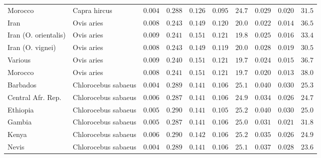 \documentclass{article}
\begin{document}
\begin{center}
\begin{longtable*}{|l|l|r|r|r|r|r|r|r|r|}
            Morocco              & Capra hircus        & $ 0.004$              & $ 0.288$                      & $ 0.126$ & $ 0.095$     & $  24.7$      & $ 0.029$ & $ 0.020$ & $  31.5$ \\
            Iran                 & Ovis aries          & $ 0.008$              & $ 0.243$                      & $ 0.149$ & $ 0.120$     & $  20.0$      & $ 0.022$ & $ 0.014$   & $  36.5$    \\
            Iran (O. orientalis) & Ovis aries          & $ 0.009$              & $ 0.241$                      & $ 0.151$ & $ 0.121$     & $  19.8$      & $ 0.025$ & $ 0.016$ & $  33.4$ \\
            Iran (O. vignei)     & Ovis aries          & $ 0.008$              & $ 0.243$                      & $ 0.149$ & $ 0.119$     & $  20.0$      & $ 0.028$ & $ 0.019$ & $  30.5$ \\
            Various              & Ovis aries          & $ 0.009$              & $ 0.240$                      & $ 0.151$ & $ 0.121$     & $  19.7$      & $ 0.024$ & $ 0.015$   & $  36.7$    \\
            Morocco              & Ovis aries          & $ 0.008$              & $ 0.241$                      & $ 0.151$ & $ 0.121$     & $  19.7$      & $ 0.020$ & $ 0.013$   & $  38.0$    \\
            Barbados             & Chlorocebus sabaeus & $ 0.004$              & $ 0.289$                      & $ 0.141$ & $ 0.106$     & $  25.1$      & $ 0.040$ & $ 0.030$ & $  25.3$ \\
            Central Afr. Rep.    & Chlorocebus sabaeus & $ 0.006$              & $ 0.287$                      & $ 0.141$ & $ 0.106$     & $  24.9$ & $ 0.034$ & $ 0.026$ & $  24.7$ \\
            Ethiopia             & Chlorocebus sabaeus & $ 0.005$              & $ 0.290$                      & $ 0.141$ & $ 0.105$     & $  25.2$      & $ 0.040$ & $ 0.030$ & $  25.0$ \\
            Gambia               & Chlorocebus sabaeus & $ 0.005$              & $ 0.287$                      & $ 0.141$ & $ 0.106$     & $  25.0$      & $ 0.031$ & $ 0.021$ & $  31.8$ \\
            Kenya                & Chlorocebus sabaeus & $ 0.006$              & $ 0.290$                      & $ 0.142$ & $ 0.106$     & $  25.2$      & $ 0.035$ & $ 0.026$ & $  24.9$ \\
            Nevis                & Chlorocebus sabaeus & $ 0.004$              & $ 0.289$                      & $ 0.141$ & $ 0.106$     & $  25.1$      & $ 0.037$ & $ 0.028$ & $  23.6$ \\

\end{longtable*}
\end{center}
\end{document}

